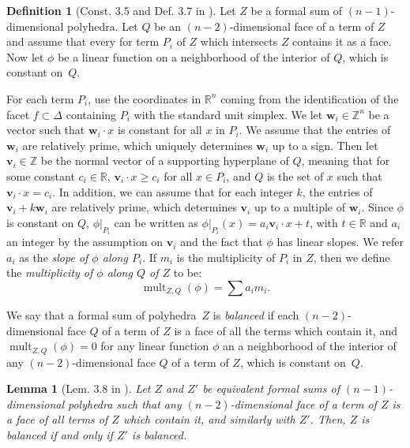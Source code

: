 \documentclass[11pt]{amsart}
\newtheorem{lem}[thm]{Lemma}
\theoremstyle{definition}
\newtheorem{defn}[thm]{Definition}
\newcommand{\defi}[1]{\emph{#1}}
\newcommand{\mult}{\operatorname{mult}}
\newcommand{\RR}{\mathbb R}
\newcommand{\ZZ}{\mathbb Z}
\begin{document}
\begin{defn}[Const. 3.5 and Def. 3.7 in \cite{cartwright-complexes}]\label{d:mult-balancing}
Let $Z$ be a formal sum of $(n-1)$-dimensional polyhedra. Let $Q$ be an
$(n-2)$-dimensional face of a term of $Z$ and assume that every for term $P_i$
of $Z$ which intersects $Z$ contains it as a face. Now let $\phi$ be a linear
function on a neighborhood of the interior of $Q$, which is constant on~$Q$.

For each term $P_i$, use the coordinates in $\RR^n$ coming from the
identification of the facet $f \subset \Delta$ containing $P_i$ with the
standard unit simplex. We let $\mathbf w_i \in \ZZ^n$ be a vector such that
$\mathbf w_i \cdot x$ is constant for all $x$ in $P_i$. We assume that the
entries of $\mathbf w_i$ are relatively prime, which uniquely determines
$\mathbf w_i$ up to a sign. Then let $\mathbf v_i \in \ZZ$ be the normal vector
of a supporting hyperplane of $Q$, meaning that for some constant $c_i \in \RR$,
$\mathbf v_i \cdot x \geq c_i$ for all $x \in P_i$, and $Q$ is the set of $x$
such that $\mathbf v_i \cdot x = c_i$. In addition, we can assume that for each
integer $k$, the entries of $\mathbf v_i + k \mathbf w_i$ are relatively prime,
which determines $\mathbf v_i$ up to a multiple of $\mathbf w_i$. Since $\phi$
is constant on $Q$, $\phi \vert_{P_i}$ can be written as $\phi\vert_{P_i} (x) =
a_i \mathbf v_i \cdot x + t$, with $t \in \RR$ and $a_i$ an integer by the
assumption on $\mathbf v_i$ and the fact that $\phi$ has linear slopes. We refer
$a_i$ as the \defi{slope of $\phi$ along $P_i$}. If $m_i$ is the multiplicity of
$P_i$ in $Z$, then we define the \defi{multiplicity of $\phi$ along $Q$ of $Z$}
to be:
\begin{equation*}
\mult_{Z,Q}(\phi) = \sum a_i m_i.
\end{equation*}

We say that a formal sum of polyhedra~$Z$ is \defi{balanced} if each
$(n-2)$-dimensional face $Q$ of a term of $Z$ is a face of all the terms which
contain it, and $\mult_{Z,Q}(\phi) = 0$ for any linear function $\phi$ an a
neighborhood of the interior of any $(n-2)$-dimensional face $Q$ of a term of
$Z$, which is constant on~$Q$.
\end{defn}

\begin{lem}[Lem. 3.8 in \cite{cartwright-complexes}]\label{l:equiv-balanced}
Let $Z$ and $Z'$ be equivalent formal sums of $(n-1)$-dimensional polyhedra such
that any $(n-2)$-dimensional face of a term of $Z$ is a face of all terms of $Z$
which contain it, and similarly with $Z'$. Then, $Z$ is balanced if and only if
$Z'$ is balanced.
\end{lem}
\end{document}
